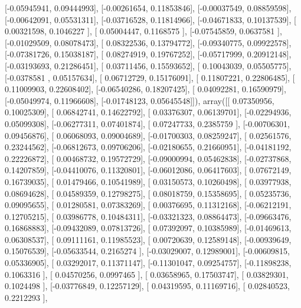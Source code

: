 \documentclass{article}
\begin{document}
       [-0.05945941,  0.09444993],
       [-0.00261654,  0.11853846],
       [-0.00037549,  0.08859598],
       [-0.00642091,  0.05531311],
       [-0.03716528,  0.11814966],
       [-0.04671833,  0.10137539],
       [ 0.00321598,  0.1046227 ],
       [ 0.05004447,  0.1168575 ],
       [-0.07545859,  0.0637581 ],
       [-0.01029509,  0.08078473],
       [ 0.08322536,  0.13794772],
       [-0.09340775,  0.09922578],
       [-0.07381726,  0.15038187],
       [ 0.08274919,  0.19767252],
       [-0.05717999,  0.20912148],
       [-0.03193693,  0.21286451],
       [ 0.03711456,  0.15593652],
       [ 0.10043039,  0.05505775],
       [-0.0378581 ,  0.05157634],
       [ 0.06712729,  0.15176091],
       [ 0.11807221,  0.22806485],
       [ 0.11009903,  0.22608402],
       [-0.06540286,  0.18207425],
       [ 0.04092281,  0.16590979],
       [-0.05049974,  0.11966608],
       [-0.01748123,  0.05645548]]), array([[ 0.07350956,  0.10025309],
       [ 0.06842741,  0.14622792],
       [ 0.03376307,  0.06139701],
       [-0.02294936,  0.05099308],
       [-0.06277311,  0.07401874],
       [ 0.07247733,  0.2385759 ],
       [-0.00706301,  0.09456876],
       [ 0.06068093,  0.09004689],
       [-0.01700303,  0.08259247],
       [ 0.02561576,  0.23244562],
       [-0.06812673,  0.09706206],
       [-0.02180655,  0.21660951],
       [-0.04181192,  0.22226872],
       [ 0.00468732,  0.19572729],
       [-0.09000994,  0.05462838],
       [-0.02737868,  0.14207859],
       [-0.04410076,  0.11320801],
       [-0.06012086,  0.06417603],
       [ 0.07672149,  0.16739035],
       [ 0.01479466,  0.10541989],
       [ 0.03150573,  0.10260498],
       [ 0.03977938,  0.08694628],
       [ 0.04589359,  0.12798275],
       [ 0.08018759,  0.15358695],
       [ 0.05235736,  0.09095655],
       [ 0.01280581,  0.07383269],
       [ 0.00376695,  0.11312168],
       [-0.06212191,  0.12705215],
       [ 0.03986778,  0.10484311],
       [-0.03321323,  0.08864473],
       [-0.09663476,  0.16868883],
       [-0.09432089,  0.07813726],
       [ 0.07392097,  0.10385989],
       [-0.01469613,  0.06308537],
       [ 0.09111161,  0.11985523],
       [ 0.00720639,  0.12589148],
       [-0.00939649,  0.15076539],
       [-0.05633544,  0.2165274 ],
       [-0.03029007,  0.12989001],
       [-0.00609815,  0.05336905],
       [ 0.03292017,  0.11371147],
       [-0.11301047,  0.09254757],
       [-0.11898238,  0.1063316 ],
       [ 0.04570256,  0.0997465 ],
       [ 0.03658965,  0.17503747],
       [ 0.03829301,  0.1024498 ],
       [-0.03776849,  0.12257129],
       [ 0.04319595,  0.11169716],
       [ 0.02840523,  0.2212293 ],
\end{document}
